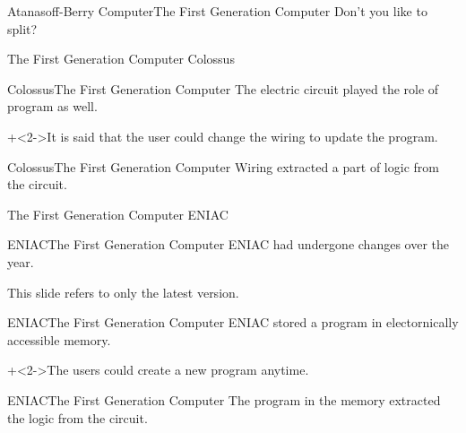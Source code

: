 \begin{frame}{Atanasoff-Berry Computer}{The First Generation Computer}
    {\Large Don't you like to split?}
\end{frame}


\begin{frame}{The First Generation Computer}{}
    {\Huge Colossus}
\end{frame}


\begin{frame}{Colossus}{The First Generation Computer}
    The electric circuit played the role of program as well.
    \vspace{4ex}

    \onslide+<2->{It is said that the user could change the wiring to update the program.}
\end{frame}


\begin{frame}{Colossus}{The First Generation Computer}
    Wiring extracted a part of logic from the circuit.
\end{frame}


\begin{frame}{The First Generation Computer}{}
    {\Huge ENIAC}
\end{frame}


\begin{frame}{ENIAC}{The First Generation Computer}
    ENIAC had undergone changes over the year.
    \vspace{4ex}

    This slide refers to only the latest version.
\end{frame}


\begin{frame}{ENIAC}{The First Generation Computer}
    ENIAC stored a program in electornically accessible memory.
    \vspace{4ex}

    \onslide+<2->{The users could create a new program anytime.}
\end{frame}


\begin{frame}{ENIAC}{The First Generation Computer}
    The program in the memory extracted the logic from the circuit.
\end{frame}
